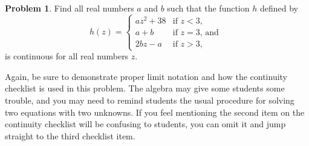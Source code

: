 \documentclass{article}
\theoremstyle{definition}
\newtheorem{Problem}{Problem}
\begin{document}
\begin{Problem}
  Find all real numbers $a$ and $b$ such that the function $h$ defined by
  \[
    h(z) =
    \begin{cases}
      az^2 + 38 &  \mbox{if $z < 3$,}\\
      a + b & \mbox{if $z = 3$, and }\\
      2bz - a &	\mbox{if $z > 3$,}
    \end{cases}
  \]
  is continuous for all real numbers $z$.
\end{Problem}
\begin{Instructor Notes}
  Again,  be sure to demonstrate proper limit notation and how the continuity checklist is used in this problem.
  The algebra may give some students some trouble, and you may need to remind students the usual procedure for solving two equations with two unknowns.
  If you feel mentioning the second item on the continuity checklist will be confusing to students, you can omit it and jump straight to the third checklist item.
\end{Instructor Notes}
\end{document}
